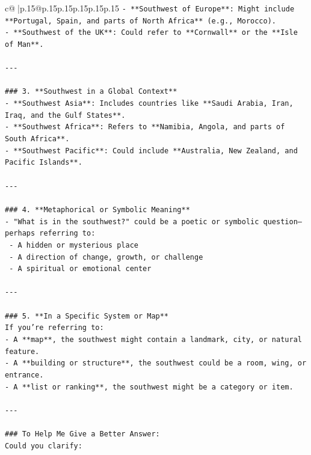 \documentclass{article}
\begin{document}
{\begin{supertabular}{c@{$\;$}|p{.15\linewidth}@{}p{.15\linewidth}p{.15\linewidth}p{.15\linewidth}p{.15\linewidth}p{.15\linewidth}}
{{{\texttt{{-} **Southwest of Europe**: Might include **Portugal, Spain, and parts of North Africa** (e.g., Morocco).} \\
\texttt{{-} **Southwest of the UK**: Could refer to **Cornwall** or the **Isle of Man**.} \\
\\ 
\texttt{{-}{-}{-}} \\
\\ 
\texttt{\#\#\# 3. **Southwest in a Global Context**} \\
\texttt{{-} **Southwest Asia**: Includes countries like **Saudi Arabia, Iran, Iraq, and the Gulf States**.} \\
\texttt{{-} **Southwest Africa**: Refers to **Namibia, Angola, and parts of South Africa**.} \\
\texttt{{-} **Southwest Pacific**: Could include **Australia, New Zealand, and Pacific Islands**.} \\
\\ 
\texttt{{-}{-}{-}} \\
\\ 
\texttt{\#\#\# 4. **Metaphorical or Symbolic Meaning**} \\
\texttt{{-} "What is in the southwest?" could be a poetic or symbolic question—perhaps referring to:} \\
\texttt{  {-} A hidden or mysterious place} \\
\texttt{  {-} A direction of change, growth, or challenge} \\
\texttt{  {-} A spiritual or emotional center} \\
\\ 
\texttt{{-}{-}{-}} \\
\\ 
\texttt{\#\#\# 5. **In a Specific System or Map**} \\
\texttt{If you're referring to:} \\
\texttt{{-} A **map**, the southwest might contain a landmark, city, or natural feature.} \\
\texttt{{-} A **building or structure**, the southwest could be a room, wing, or entrance.} \\
\texttt{{-} A **list or ranking**, the southwest might be a category or item.} \\
\\ 
\texttt{{-}{-}{-}} \\
\\ 
\texttt{\#\#\# To Help Me Give a Better Answer:} \\
\texttt{Could you clarify:} \\
}}}
\end{supertabular}}
\end{document}
